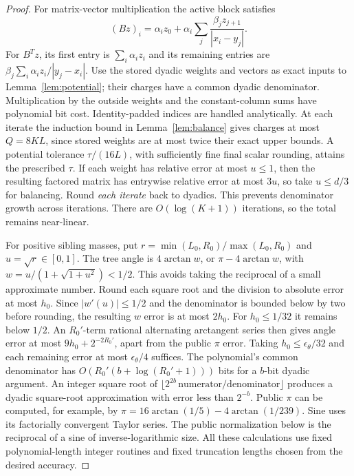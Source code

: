\documentclass[11pt]{article}
\theoremstyle{definition}
\begin{document}
\begin{proof}
For matrix-vector multiplication the active block satisfies
\[
 (Bz)_i=\alpha_i z_0+
       \alpha_i\sum_j\frac{\beta_jz_{j+1}}{|x_i-y_j|}.
\]
For $B^Tz$, its first entry is $\sum_i\alpha_i z_i$ and its remaining
entries are $\beta_j\sum_i\alpha_i z_i/|y_j-x_i|$.
Use the stored dyadic weights and vectors as exact inputs to
Lemma~\ref{lem:potential}; their charges have a common dyadic denominator.
Multiplication by the outside weights and the constant-column sums have
polynomial bit cost. Identity-padded indices are handled analytically.
At each iterate the induction bound in Lemma~\ref{lem:balance} gives
charges at most $Q=8KL$, since stored weights are at most twice their
exact upper bounds. A potential tolerance $\tau/(16L)$, with sufficiently
fine final scalar rounding, attains the prescribed $\tau$. If each weight
has relative error at most $u\le1$, then the resulting factored matrix has
entrywise relative error at most $3u$, so take $u\le d/3$ for balancing.
Round \emph{each iterate}
back to dyadics. This prevents denominator growth across iterations.
There are $O(\log(K+1))$ iterations, so the total remains near-linear.

For positive sibling masses, put $r=\min(L_0,R_0)/\max(L_0,R_0)$ and
$u=\sqrt r\in[0,1]$. The tree angle is $4\arctan w$, or
$\pi-4\arctan w$, with $w=u/(1+\sqrt{1+u^2})<1/2$.
This avoids taking the reciprocal of a small approximate number.
Round each square root and the division to absolute error at most $h_0$.
Since $|w'(u)|\le1/2$ and the denominator is bounded below by two before
rounding, the resulting $w$ error is at most $2h_0$.
For $h_0\le1/32$ it remains below $1/2$.
An $R_0'$-term rational alternating arctangent series then gives angle
error at most $9h_0+2^{-2R_0'}$, apart from the public $\pi$ error.
Taking $h_0\le\epsilon_\theta/32$ and each remaining error at most
$\epsilon_\theta/4$ suffices. The polynomial's common denominator has
$O(R_0'(b+\log(R_0'+1)))$ bits for a $b$-bit dyadic argument.
An integer square root of
$\lfloor2^{2b}\,\text{numerator}/\text{denominator}\rfloor$
produces a dyadic square-root approximation with error less than $2^{-b}$.
Public $\pi$ can be computed, for
example, by $\pi=16\arctan(1/5)-4\arctan(1/239)$.
Sine uses its factorially convergent Taylor series. The public
normalization below is the reciprocal of a sine of inverse-logarithmic
size. All these calculations use fixed polynomial-length integer routines
and fixed truncation lengths chosen from the desired accuracy.
\end{proof}
\end{document}

